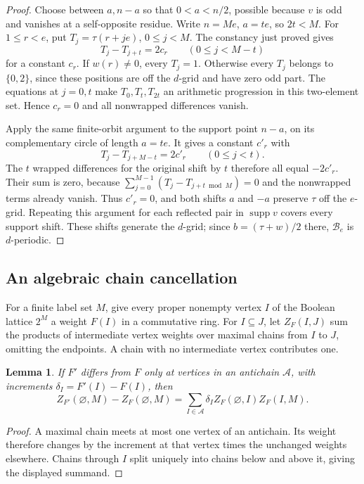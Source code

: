 \documentclass[11pt,a4paper]{amsart}
\numberwithin{equation}{section}
\theoremstyle{plain}
\newtheorem{lemma}[theorem]{Lemma}
\theoremstyle{definition}
\newcommand{\supp}{\operatorname{supp}}
\begin{document}
\begin{proof}
Choose between \(a,n-a\) so that \(0<a<n/2\), possible because
\(v\) is odd and vanishes at a self-opposite residue.  Write
\(n=Me\), \(a=te\), so \(2t<M\).  For \(1\le r<e\), put
\(T_j=\tau(r+je)\), \(0\le j<M\).  The constancy just proved gives
\[
T_j-T_{j+t}=2c_r\qquad(0\le j<M-t)
\]
for a constant \(c_r\).  If \(w(r)\ne0\), every \(T_j=1\).
Otherwise every \(T_j\) belongs to \(\{0,2\}\), since these positions
are off the \(d\)-grid and have zero odd part.  The equations at
\(j=0,t\) make \(T_0,T_t,T_{2t}\) an arithmetic progression in this
two-element set.  Hence \(c_r=0\) and all nonwrapped differences vanish.

Apply the same finite-orbit argument to the support point \(n-a\), on
its complementary circle of length \(a=te\).  It gives a constant
\(c'_r\) with
\[
T_j-T_{j+M-t}=2c'_r\qquad(0\le j<t).
\]
The \(t\) wrapped differences for the original shift by \(t\) therefore
all equal \(-2c'_r\).  Their sum is zero, because
\(\sum_{j=0}^{M-1}(T_j-T_{j+t\bmod M})=0\) and the nonwrapped terms
already vanish.  Thus \(c'_r=0\), and both shifts \(a\) and \(-a\)
preserve \(\tau\) off the \(e\)-grid.  Repeating this argument for each
reflected pair in \(\supp v\) covers every support shift.  These shifts
generate the \(d\)-grid; since \(b=(\tau+w)/2\) there, \(\mathcal B_e\)
is \(d\)-periodic.
\end{proof}

\subsection{An algebraic chain cancellation}
For a finite label set \(M\), give every proper nonempty vertex \(I\)
of the Boolean lattice \(2^M\) a weight \(F(I)\) in a commutative ring.
For \(I\subseteq J\), let \(Z_F(I,J)\) sum the products of intermediate
vertex weights over maximal chains from \(I\) to \(J\), omitting the
endpoints.  A chain with no intermediate vertex contributes one.

\begin{lemma}\label{lem:antichain}
If \(F'\) differs from \(F\) only at vertices in an antichain
\(\mathscr A\), with increments \(\delta_I=F'(I)-F(I)\), then
\[
Z_{F'}(\varnothing,M)-Z_F(\varnothing,M)
=\sum_{I\in\mathscr A}\delta_I Z_F(\varnothing,I)Z_F(I,M).
\]
\end{lemma}
\begin{proof}
A maximal chain meets at most one vertex of an antichain.  Its weight
therefore changes by the increment at that vertex times the unchanged
weights elsewhere.  Chains through \(I\) split uniquely into chains
below and above it, giving the displayed summand.
\end{proof}
\end{document}
